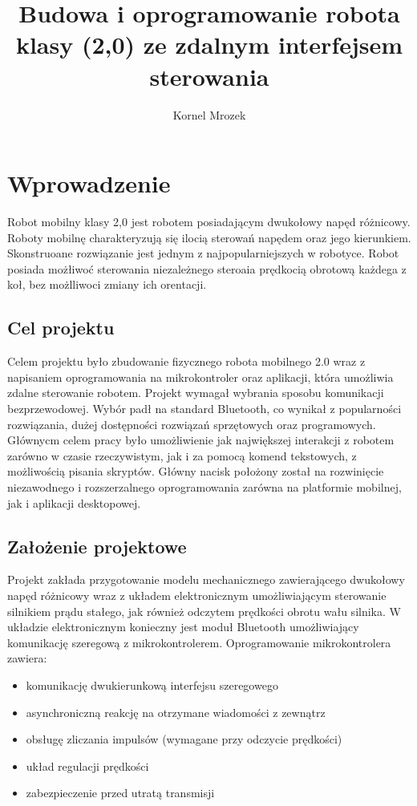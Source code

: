 \documentclass[eng,printmode]{mgr}
\title{Budowa i oprogramowanie robota klasy (2,0) ze zdalnym interfejsem sterowania}
\author{Kornel Mrozek}
\begin{document}

\maketitle %

\tableofcontents %

\chapter{Wprowadzenie}

Robot mobilny klasy 2,0 jest robotem posiadającym dwukołowy napęd różnicowy. Roboty mobilnę charakteryzują się ilocią sterowań napędem oraz jego kierunkiem. Skonstruoane rozwiązanie jest jednym z najpopularniejszych  w robotyce. Robot posiada możłiwoć sterowania niezależnego steroaia prędkocią obrotową każdega z koł, bez możlliwoci zmiany ich orentacji.  
 \section{Cel projektu}

Celem projektu było zbudowanie fizycznego robota mobilnego 2.0 wraz z napisaniem oprogramowania na mikrokontroler oraz aplikacji, która umożliwia zdalne sterowanie robotem. Projekt wymagał wybrania sposobu komunikacji bezprzewodowej. Wybór padł na standard Bluetooth, co wynikał z popularności rozwiązania, dużej dostępności rozwiązań sprzętowych oraz programowych. Głównycm celem pracy było umożliwienie  jak największej interakcji z robotem zarówno w czasie rzeczywistym, jak i za pomocą komend tekstowych, z możliwością pisania skryptów. Główny nacisk położony został na rozwinięcie niezawodnego i rozszerzalnego oprogramowania zarówna na platformie mobilnej, jak i aplikacji desktopowej. 

 \section{Założenie projektowe} 

Projekt zakłada przygotowanie modelu mechanicznego zawierającego dwukołowy napęd różnicowy wraz z  układem elektronicznym umożliwiającym sterowanie silnikiem prądu stałego, jak również odczytem prędkości obrotu wału silnika. W układzie elektronicznym konieczny jest moduł Bluetooth umożliwiający komunikację szeregową z mikrokontrolerem. Oprogramowanie mikrokontrolera zawiera:
\begin{itemize}
  \item komunikację dwukierunkową interfejsu szeregowego
  \item asynchroniczną reakcję na otrzymane wiadomości z zewnątrz
  \item obsługę zliczania impulsów (wymagane przy odczycie prędkości)
  \item układ regulacji prędkości 
  \item zabezpieczenie przed utratą transmisji
\end{itemize}
\end{document}
